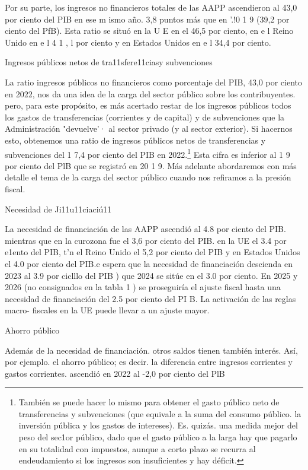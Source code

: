\documentclass[10pt,a4paper]{article}
\begin{document}
Por su parte, los ingresos no financieros totales de las AAPP ascendieron al 43,0 por ciento del PIB en ese m ismo año. 3,8 puntos más que en '.!0 1 9 (39,2 por ciento del PfB). Esta ratio se situó en la U E en el 46,5 por ciento, en e l Reino Unido en e l 4 1 , l por ciento y en Estados Unidos en e l 34,4 por ciento.

Ingresos públicos netos de tra11sfere11ciasy subvenciones

La ratio ingresos públicos no financieros como porcentaje del PIB, 43,0 por ciento en 2022, nos da una idea de la carga del sector público sobre los contribuyentes. pero, para este propósito, es más acertado restar de los ingresos públicos todos los gastos de transferencias (corrientes y de capital) y de subvenciones que la Administración "devuelve'· al sector privado (y al sector exterior). Si hacernos esto, obtenemos una ratio de ingresos públicos netos de transferencias y subvenciones del 1 7,4 por ciento del PIB en 2022.\footnote{%
    También se puede hacer lo mismo para obtener el gasto público neto de transferencias y subvenciones (que equivale a la suma del consumo público. la inversión pública y los gastos de intereses). Es. quizás. una medida mejor del peso del sec1or público, dado que el gasto público a la larga hay que pagarlo en su totalidad con impuestos, aunque a corto plazo se recurra al endeudamiento si los ingresos son insuficientes y hay déficit.
} Esta cifra es inferior al 1 9 por ciento del PlB que se registró en 20 1 9. Más adelante abordaremos con más detalle el tema de la carga del sector público cuando nos refiramos a la presión fiscal.

Necesidad de Ji11u11ciaciú11

La necesidad de financiación de las AAPP ascendió al 4.8 por ciento del PIB. mientras que en la curozona fue el 3,6 por ciento del PIB. en la UE el 3.4 por e1ento del PIB, t'n el Reino Unido el 5,2 por ciento del PIB y en Estados Unidos el 4.0 por ciento del PIB.e espera que la necesidad de financiación descienda en 2023 al 3.9 por ciclllo del PIB ) que 2024 se sitúe en el 3.0 por ciento. En 2025 y 2026 (no consignados en la tabla 1 ) se proseguiría el ajuste fiscal hasta una necesidad de financiación del 2.5 por ciento del PI B. La activación de las reglas macro- fiscales en la UE puede llevar a un ajuste mayor.

Ahorro público

Además de la necesidad de financiación. otros saldos tienen también interés. Así, por ejemplo. el ahorro público; es decir. la diferencia entre ingresos corrientes y gastos corrientes. ascendió en 2022 al -2,0 por ciento del PlB
\end{document}
